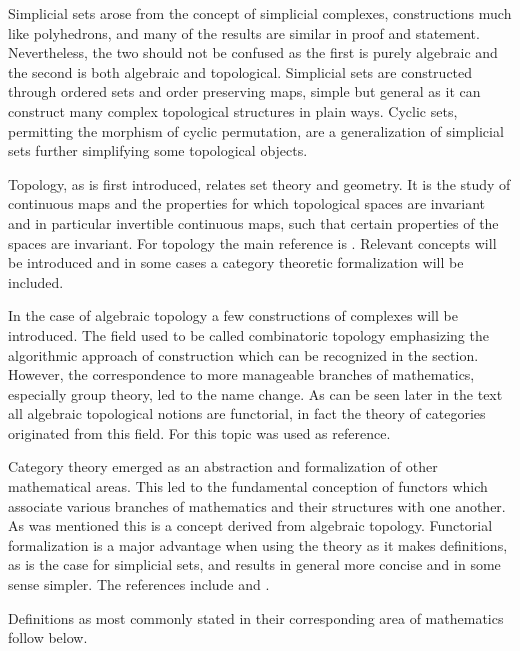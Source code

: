 \documentclass[../../main.tex]{subfiles}
\begin{document}
    Simplicial sets arose from the concept of simplicial complexes, constructions much like polyhedrons, and many of the results are similar in proof and statement. Nevertheless, the two should not be confused as the first is purely algebraic and the second is both algebraic and topological. Simplicial sets are constructed through ordered sets and order preserving maps, simple but general as it can construct many complex topological structures in plain ways. Cyclic sets, permitting the morphism of cyclic permutation, are a generalization of simplicial sets further simplifying some topological objects. 
    
    Topology, as is first introduced, relates set theory and geometry. It is the study of continuous maps and the properties for which topological spaces are invariant and in particular invertible continuous maps, such that certain properties of the spaces are invariant. For topology the main reference is \cite{armstrong-basictop}. Relevant concepts will be introduced and in some cases a category theoretic formalization will be included. 
    
    In the case of algebraic topology a few constructions of complexes will be introduced. The field used to be called combinatoric topology emphasizing the algorithmic approach of construction which can be recognized in the section. However, the correspondence to more manageable branches of mathematics, especially group theory, led to the name change. As can be seen later in the text all algebraic topological notions are functorial, in fact the theory of categories originated from this field. For this topic \cite{simp-maye} was used as reference.
    
    Category theory emerged as an abstraction and formalization of other mathematical areas. This led to the fundamental conception of functors which associate various branches of mathematics and their structures with one another. As was mentioned this is a concept derived from algebraic topology. Functorial formalization is a major advantage when using the theory as it makes definitions, as is the case for simplicial sets, and results in general more concise and in some sense simpler. The references include \cite{simp-maye} and \cite{cate-mac}.

    Definitions as most commonly stated in their corresponding area of mathematics follow below. 
    
\end{document}
